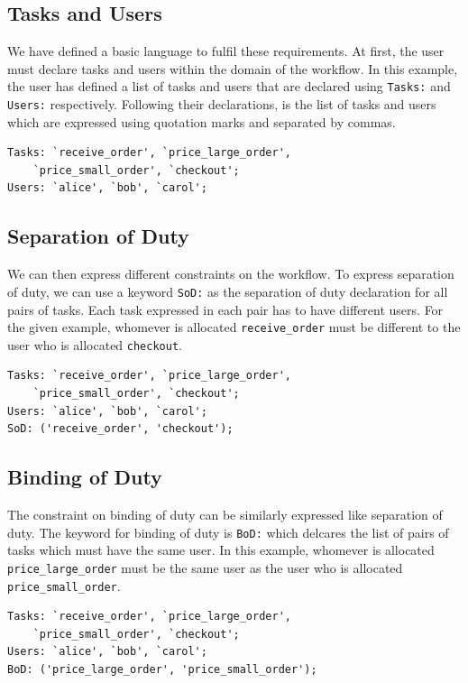 \documentclass[a4paper]{report}
\begin{document}
\subsection{Tasks and Users}
We have defined a basic language to fulfil these requirements. At first, the user must declare tasks and users within the domain of the workflow. In this example, the user has defined a list of tasks and users that are declared using \texttt{Tasks:} and \texttt{Users:} respectively. Following their declarations, is the list of tasks and users which are expressed using quotation marks and separated by commas. 
\lstset{numbers=none, showspaces=false,
    showstringspaces=false, tabsize=2, breaklines=true,
    xleftmargin=5.0ex,
}
\lstset{basicstyle=\ttfamily}
\begin{lstlisting}[frame=single]
Tasks: `receive_order', `price_large_order', 
	`price_small_order', `checkout'; 
Users: `alice', `bob', `carol';
\end{lstlisting}

\subsection{Separation of Duty}
We can then express different constraints on the workflow. To express separation of duty, we can use a keyword \texttt{SoD:} as the separation of duty declaration for all pairs of tasks. Each task expressed in each pair has to have different users. For the given example, whomever is allocated \texttt{receive\_order} must be different to the user who is allocated \texttt{checkout}.
\begin{lstlisting}[frame=single]
Tasks: `receive_order', `price_large_order', 
	`price_small_order', `checkout'; 
Users: `alice', `bob', `carol';
SoD: ('receive_order', 'checkout');
\end{lstlisting}

\subsection{Binding of Duty}
The constraint on binding of duty can be similarly expressed like separation of duty. The keyword for binding of duty is \texttt{BoD:} which delcares the list of pairs of tasks which must have the same user. In this example, whomever is allocated \texttt{price\_large\_order} must be the same user as the user who is allocated \texttt{price\_small\_order}.
\begin{lstlisting}[frame=single]
Tasks: `receive_order', `price_large_order', 
	`price_small_order', `checkout'; 
Users: `alice', `bob', `carol';
BoD: ('price_large_order', 'price_small_order');
\end{lstlisting}
\end{document}
